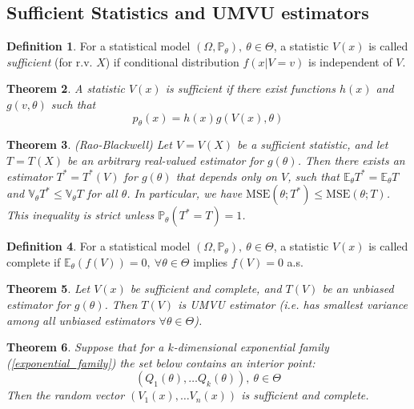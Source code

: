 \documentclass[12pt]{article}
\newtheorem{theorem}{Theorem}[section]
\theoremstyle{definition}
\newtheorem{definition}[theorem]{Definition}
\theoremstyle{remark}
\numberwithin{equation}{section}
\newcommand{\PP}{\mathbb{P}}
\newcommand{\EE}{\mathbb{E}}
\newcommand{\VV}{\mathbb{V}}
\begin{document}
\subsection{Sufficient Statistics and UMVU estimators}

\begin{definition}
	For a statistical model $(\Omega, \PP_\theta), \ \theta \in \Theta$, a statistic $V(x)$ is called \emph{sufficient} (for r.v. $X$) if conditional distribution $f(x|V = v)$ is independent of $V$.
\end{definition}

\begin{theorem}\label{factorizarion}
	A statistic $V(x)$ is sufficient if there exist functions $h(x)$ and $g(v, \theta)$ such that
	$$
	p_\theta(x) = h(x)g(V(x), \theta)
	$$
\end{theorem}

\begin{theorem}\emph{(Rao-Blackwell)}
	Let $V = V(X)$ be a sufficient statistic, and let $T = T(X)$ be an arbitrary real-valued estimator for $g(\theta)$. Then there exists an estimator $T^* = T^*(V)$ for $g(\theta)$ that depends only on $V$, such that $\EE_\theta T^* = \EE_\theta T$ and $\VV_\theta T^* \leq \VV_\theta T$ for all $\theta$. In particular, we have $\text{MSE}(\theta; T^*) \leq \text{MSE}(\theta; T)$. This inequality is strict unless $\PP_\theta(T^* = T) = 1$.
\end{theorem}

\begin{definition}
For a statistical model $(\Omega, \PP_\theta), \ \theta \in \Theta$, a statistic $V(x)$	is called complete if $\EE_\theta(f(V)) = 0,\ \forall \theta\in \Theta$ implies $f(V)=0$ a.s.
\end{definition}

\begin{theorem}
	Let $V(x)$ be sufficient and complete, and $T(V)$ be an unbiased estimator for $g(\theta)$. Then $T(V)$ is UMVU estimator (i.e. has smallest variance among all unbiased estimators $\forall\theta\in\Theta$).
\end{theorem}

\begin{theorem}
	Suppose that for a $k$-dimensional exponential family (\ref{exponential_family}) the set below contains an interior point:
\begin{equation*}
	(Q_1(\theta),\ldots Q_k(\theta)),\ \theta\in\Theta
\end{equation*}
Then the random vector $\left(V_1(x),\ldots V_n(x)\right)$ is sufficient and complete.
\end{theorem}
\end{document}
